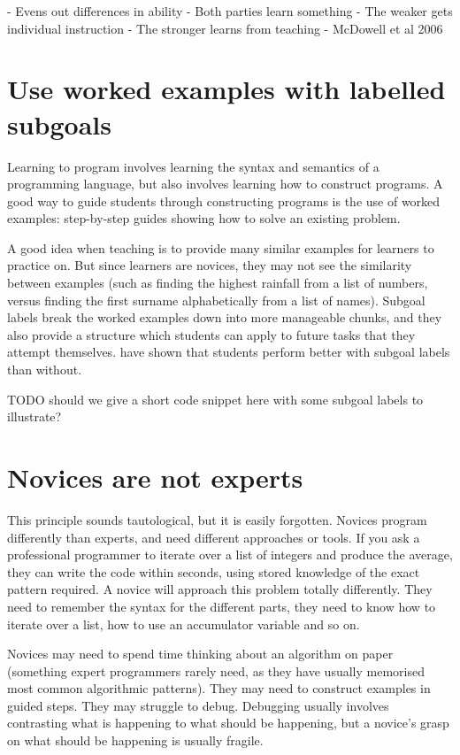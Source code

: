 \documentclass{article}
\begin{document}
- Evens out differences in ability
- Both parties learn something
  - The weaker gets individual instruction
  - The stronger learns from teaching
- McDowell et al 2006

\section{Use worked examples with labelled subgoals}

Learning to program involves learning the syntax and semantics of a programming language, but also involves learning how to construct programs.  A good way to guide students through constructing programs is the use of worked examples: step-by-step guides showing how to solve an existing problem.

A good idea when teaching is to provide many similar examples for learners to practice on.  But since learners are novices, they may not see the similarity between examples (such as finding the highest rainfall from a list of numbers, versus finding the first surname alphabetically from a list of names).  Subgoal labels break the worked examples down into more manageable chunks, and they also provide a structure which students can apply to future tasks that they attempt themselves.  \citet{morrison-subgoals,morrison-parsons} have shown that students perform better with subgoal labels than without.

TODO should we give a short code snippet here with some subgoal labels to illustrate?

\section{Novices are not experts}

This principle sounds tautological, but it is easily forgotten.  Novices program differently than experts, and need different approaches or tools.  If you ask a professional programmer to iterate over a list of integers and produce the average, they can write the code within seconds, using stored knowledge of the exact pattern required.  A novice will approach this problem totally differently.  They need to remember the syntax for the different parts, they need to know how to iterate over a list, how to use an accumulator variable and so on.

Novices may need to spend time thinking about an algorithm on paper (something expert programmers rarely need, as they have usually memorised most common algorithmic patterns).  They may need to construct examples in guided steps.  They may struggle to debug.  Debugging usually involves contrasting what is happening to what should be happening, but a novice's grasp on what should be happening is usually fragile.
\end{document}
